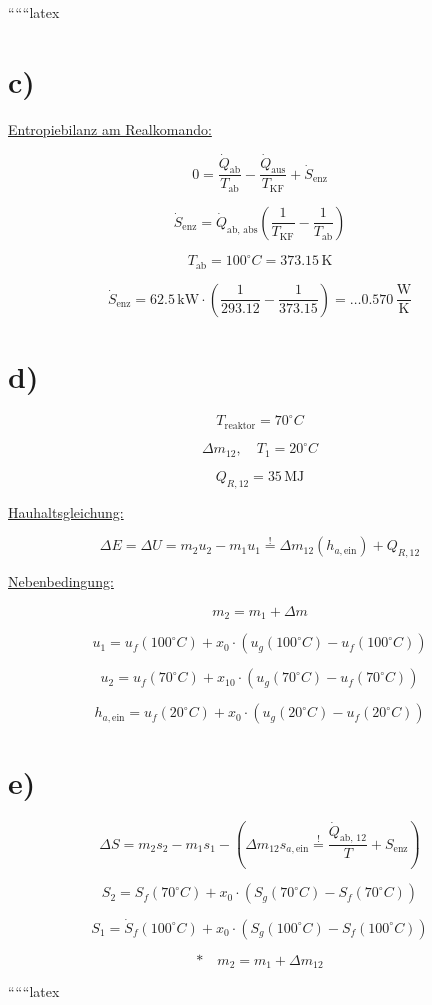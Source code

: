 ``````latex


\section*{c)}
\underline{Entropiebilanz am Realkomando:}

\[
0 = \frac{\dot{Q}_{\text{ab}}}{T_{\text{ab}}} - \frac{\dot{Q}_{\text{aus}}}{T_{\text{KF}}} + \dot{S}_{\text{enz}}
\]

\[
\dot{S}_{\text{enz}} = \dot{Q}_{\text{ab, abs}} \left( \frac{1}{T_{\text{KF}}} - \frac{1}{T_{\text{ab}}} \right)
\]

\[
T_{\text{ab}} = 100^\circ C = 373.15 \, \text{K}
\]

\[
\dot{S}_{\text{enz}} = 62.5 \, \text{kW} \cdot \left( \frac{1}{293.12} - \frac{1}{373.15} \right) = \dots 0.570 \, \frac{\text{W}}{\text{K}}
\]

\section*{d)}
\[
T_{\text{reaktor}} = 70^\circ C
\]

\[
\Delta m_{12}, \quad T_1 = 20^\circ C
\]

\[
Q_{R,12} = 35 \, \text{MJ}
\]

\underline{Hauhaltsgleichung:}

\[
\Delta E = \Delta U = m_2 u_2 - m_1 u_1 \stackrel{!}{=} \Delta m_{12} \left( h_{a, \text{ein}} \right) + Q_{R,12}
\]

\underline{Nebenbedingung:}

\[
m_2 = m_1 + \Delta m
\]

\[
u_1 = u_f (100^\circ C) + x_0 \cdot (u_g (100^\circ C) - u_f (100^\circ C))
\]

\[
u_2 = u_f (70^\circ C) + x_{10} \cdot (u_g (70^\circ C) - u_f (70^\circ C))
\]

\[
h_{a, \text{ein}} = u_f (20^\circ C) + x_0 \cdot (u_g (20^\circ C) - u_f (20^\circ C))
\]

\section*{e)}
\[
\Delta S = m_2 s_2 - m_1 s_1 - (\Delta m_{12} s_{a, \text{ein}} \stackrel{!}{=} \frac{\dot{Q}_{\text{ab, 12}}}{T} + S_{\text{enz}})
\]

\[
S_2 = S_f (70^\circ C) + x_0 \cdot (S_g (70^\circ C) - S_f (70^\circ C))
\]

\[
S_1 = \dot{S}_f (100^\circ C) + x_0 \cdot (S_g (100^\circ C) - S_f (100^\circ C))
\]

\[
\text{*} \quad m_2 = m_1 + \Delta m_{12}
\]

``````latex


